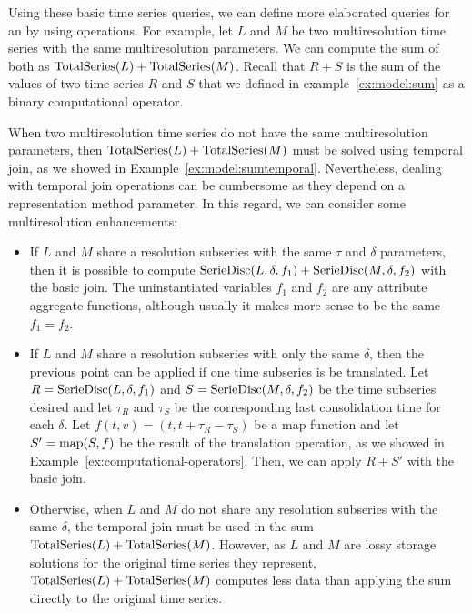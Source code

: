 Using these basic time series queries, we can define more elaborated
queries for an  by using  operations. For
example, let $L$ and $M$ be two multiresolution time series with the
same multiresolution parameters. We can compute the sum of both as
$\operatorname{TotalSeries}(L) + \operatorname{TotalSeries}(M)$. Recall that $R+S$ is the sum of
the values of two time series $R$ and $S$ that we defined in
example~\ref{ex:model:sum} as a binary computational operator.


When two multiresolution time series do not have the same
multiresolution parameters, then $\operatorname{TotalSeries}(L) + \operatorname{TotalSeries}(M)$
must be solved using temporal join, as we showed in
Example~\ref{ex:model:sumtemporal}. Nevertheless, dealing with
temporal join operations can be cumbersome as they depend on a
representation method parameter. In this regard, we can consider some
multiresolution enhancements:

\begin{itemize}

\item If $L$ and $M$ share a resolution subseries with the same
  $\tau$ and $\delta$ parameters, then it is possible to compute
  $\operatorname{SerieDisc}(L,\delta,f_1) + \operatorname{SerieDisc}(M,\delta,f_2)$ with the basic
  join. The uninstantiated variables $f_1$ and $f_2$ are any attribute
  aggregate functions, although usually it makes more sense to be the
  same $f_1=f_2$.

\item If $L$ and $M$ share a resolution subseries with only the same
  $\delta$, then the previous point can be applied if one time
  subseries is be translated. Let $R=\operatorname{SerieDisc}(L,\delta,f_1)$ and
  $S=\operatorname{SerieDisc}(M,\delta,f_2)$ be the time subseries desired and let
  $\tau_R$ and $\tau_S$ be the corresponding last consolidation time
  for each $\delta$. Let $f(t,v)=(t,t+\tau_R-\tau_S)$ be a map
  function and let $S'=\operatorname*{map}(S,f)$ be the result of the translation
  operation, as we showed in Example~\ref{ex:computational-operators}.
  Then, we can apply $R+S'$ with the basic join.
  
\item Otherwise, when $L$ and $M$ do not share any resolution
  subseries with the same $\delta$, the temporal join must be used in
  the sum $\operatorname{TotalSeries}(L) + \operatorname{TotalSeries}(M)$.  However, as $L$ and
  $M$ are lossy storage solutions for the original time series they
  represent, $\operatorname{TotalSeries}(L) + \operatorname{TotalSeries}(M)$ computes less data
  than applying the sum directly to the original time series.

\end{itemize}




